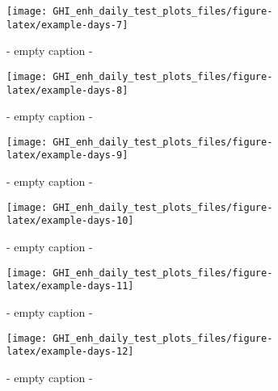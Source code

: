 \documentclass[
  10pt,
  a4paper,oneside]{article}
\begin{document}
\begin{figure}[H]

{\centering \texttt{[image: GHI\_enh\_daily\_test\_plots\_files/figure-latex/example-days-7]} 

}

\caption{ - empty caption - }\label{fig:example-days-7}
\end{figure}

\begin{figure}[H]

{\centering \texttt{[image: GHI\_enh\_daily\_test\_plots\_files/figure-latex/example-days-8]} 

}

\caption{ - empty caption - }\label{fig:example-days-8}
\end{figure}

\begin{figure}[H]

{\centering \texttt{[image: GHI\_enh\_daily\_test\_plots\_files/figure-latex/example-days-9]} 

}

\caption{ - empty caption - }\label{fig:example-days-9}
\end{figure}

\begin{figure}[H]

{\centering \texttt{[image: GHI\_enh\_daily\_test\_plots\_files/figure-latex/example-days-10]} 

}

\caption{ - empty caption - }\label{fig:example-days-10}
\end{figure}

\begin{figure}[H]

{\centering \texttt{[image: GHI\_enh\_daily\_test\_plots\_files/figure-latex/example-days-11]} 

}

\caption{ - empty caption - }\label{fig:example-days-11}
\end{figure}

\begin{figure}[H]

{\centering \texttt{[image: GHI\_enh\_daily\_test\_plots\_files/figure-latex/example-days-12]} 

}

\caption{ - empty caption - }\label{fig:example-days-12}
\end{figure}
\end{document}
